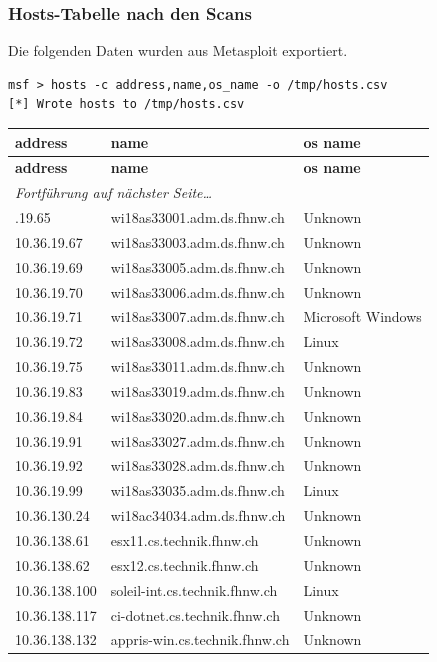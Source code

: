\documentclass[a4paper,11pt]{scrartcl}
\begin{document}
\subsubsection{Hosts-Tabelle nach den Scans}
Die folgenden Daten wurden aus Metasploit exportiert.
\begin{lstlisting}
msf > hosts -c address,name,os_name -o /tmp/hosts.csv
[*] Wrote hosts to /tmp/hosts.csv
\end{lstlisting}
\begin{longtable}{p{2.5cm}|p{8cm}|l}
	\textbf{address} & \textbf{name} & \textbf{os name}\\
	\hline
	\endfirsthead
	\textbf{address} & \textbf{name} & \textbf{os name}\\
	\hline
	\endhead
	\hline
	\multicolumn{2}{l}{\textit{Fortführung auf nächster Seite\ldots}} \\
	\endfoot
	\endlastfoot
	10.36.19.65 & wi18as33001.adm.ds.fhnw.ch & Unknown\\
	10.36.19.67 & wi18as33003.adm.ds.fhnw.ch & Unknown\\
	10.36.19.69 & wi18as33005.adm.ds.fhnw.ch & Unknown\\
	10.36.19.70 & wi18as33006.adm.ds.fhnw.ch & Unknown\\
	10.36.19.71 & wi18as33007.adm.ds.fhnw.ch & Microsoft Windows\\
	10.36.19.72 & wi18as33008.adm.ds.fhnw.ch & Linux\\
	10.36.19.75 & wi18as33011.adm.ds.fhnw.ch & Unknown\\
	10.36.19.83 & wi18as33019.adm.ds.fhnw.ch & Unknown\\
	10.36.19.84 & wi18as33020.adm.ds.fhnw.ch & Unknown\\
	10.36.19.91 & wi18as33027.adm.ds.fhnw.ch & Unknown\\
	10.36.19.92 & wi18as33028.adm.ds.fhnw.ch & Unknown\\
	10.36.19.99 & wi18as33035.adm.ds.fhnw.ch & Linux\\
	10.36.130.24 & wi18ac34034.adm.ds.fhnw.ch & Unknown\\
	10.36.138.61 & esx11.cs.technik.fhnw.ch & Unknown\\
	10.36.138.62 & esx12.cs.technik.fhnw.ch & Unknown\\
	10.36.138.100 & soleil-int.cs.technik.fhnw.ch & Linux\\
	10.36.138.117 & ci-dotnet.cs.technik.fhnw.ch & Unknown\\
	10.36.138.132 & appris-win.cs.technik.fhnw.ch & Unknown\\

\end{longtable}
\end{document}
